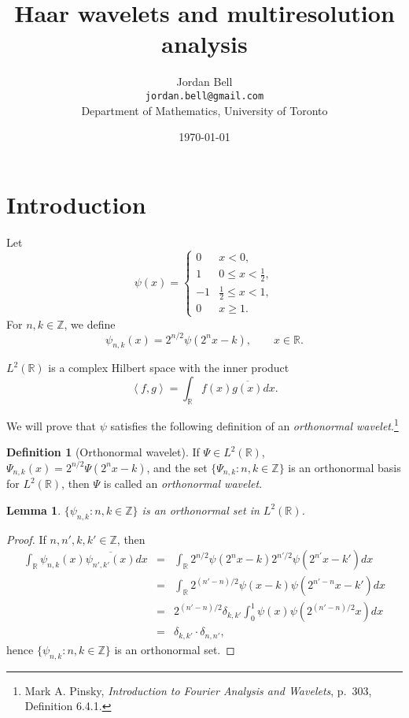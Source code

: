 \documentclass{article}
\newcommand{\inner}[2]{\left\langle #1, #2 \right\rangle}
\newtheorem{lemma}[theorem]{Lemma}
\theoremstyle{definition}
\newtheorem{definition}[theorem]{Definition}
\begin{document}
\title{Haar wavelets and multiresolution analysis}
\author{Jordan Bell\\ \texttt{jordan.bell@gmail.com}\\Department of Mathematics, University of Toronto}
\date{\today}

\maketitle

\section{Introduction}
Let
\[
\psi(x)=\begin{cases}
0&x<0,\\
1&0 \leq x < \frac{1}{2},\\
-1&\frac{1}{2} \leq x < 1,\\
0&x \geq 1.
\end{cases}
\]
For $n,k \in \mathbb{Z}$, we define
\[
\psi_{n,k}(x)=2^{n/2} \psi(2^n x-k), \qquad x \in \mathbb{R}.
\]



$L^2(\mathbb{R})$  is a complex Hilbert space with the inner product
\[
\inner{f}{g} = \int_{\mathbb{R}} f(x) \overline{g(x)} dx.
\]

We will prove that $\psi$ satisfies   the following definition of an {\em orthonormal wavelet}.\footnote{Mark A. Pinsky, {\em Introduction to
Fourier Analysis and Wavelets}, p.~303, Definition 6.4.1.}

\begin{definition}[Orthonormal wavelet]
If $\Psi \in L^2(\mathbb{R})$, $\Psi_{n,k}(x)=2^{n/2}\Psi(2^nx-k)$, and the set $\{\Psi_{n,k}: n,k \in \mathbb{Z}\}$ is an orthonormal basis for $L^2(\mathbb{R})$,
then $\Psi$ is called an {\em orthonormal wavelet}.
\end{definition}

\begin{lemma}
$\{\psi_{n,k}: n,k \in \mathbb{Z}\}$ is an  orthonormal set in $L^2(\mathbb{R})$.
\label{orthonormal}
\end{lemma}
\begin{proof}
If $n,n',k,k' \in \mathbb{Z}$, then
\begin{eqnarray*}
\int_{\mathbb{R}} \psi_{n,k}(x) \overline{\psi_{n',k'}(x)} dx&=&\int_{\mathbb{R}} 2^{n/2} \psi(2^nx-k)2^{n'/2} \psi(2^{n'}x-k') dx\\
&=&\int_{\mathbb{R}} 2^{(n'-n)/2} \psi(x-k) \psi(2^{n'-n}x-k') dx\\
&=& 2^{(n'-n)/2} \delta_{k,k'}  \int_0^1 \psi(x) \psi(2^{(n'-n)/2}x) dx\\
&=&\delta_{k,k'} \cdot \delta_{n,n'},
\end{eqnarray*}
hence  $\{\psi_{n,k}: n,k \in \mathbb{Z}\}$ is an orthonormal set.
\end{proof}
\end{document}
